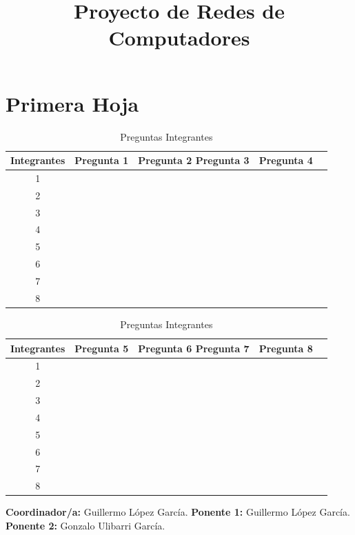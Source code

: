 \documentclass[]{article}
\title{Proyecto de Redes de Computadores}
\author{}
\begin{document}
\maketitle
\newpage

\section{Primera Hoja}
\begin{table}[h!]
  \begin{center}
    \caption{Preguntas Integrantes}
    \begin{tabular}{ccccc}
      \toprule
      \textbf{Integrantes} & \textbf{Pregunta 1} & \textbf{Pregunta 2}
      \textbf{Pregunta 3} & \textbf{Pregunta 4} \\
      \midrule
      1 &  &  \\
      2 &  &  \\
      3 &  &  \\
      4 &  &  \\
      5 &  &  \\
      6 &  &  \\
      7 &  &  \\
      8 &  &  \\
      \bottomrule
    \end{tabular}
  \end{center}
\end{table}

\begin{table}[h!]
  \begin{center}
    \caption{Preguntas Integrantes}
    \begin{tabular}{ccccc}
      \toprule
      \textbf{Integrantes} & \textbf{Pregunta 5} & \textbf{Pregunta 6}
      \textbf{Pregunta 7} & \textbf{Pregunta 8} \\
      \midrule
      1 &  &  \\
      2 &  &  \\
      3 &  &  \\
      4 &  &  \\
      5 &  &  \\
      6 &  &  \\
      7 &  &  \\
      8 &  &  \\
      \bottomrule
    \end{tabular}
  \end{center}
\end{table}

\textbf{Coordinador/a: } Guillermo López García. \newline
\textbf{Ponente 1: } Guillermo López García. \newline
\textbf{Ponente 2: } Gonzalo Ulibarri García.
\end{document}
